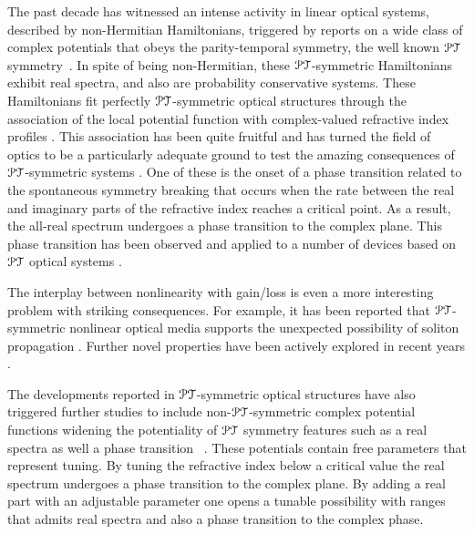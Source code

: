 \documentclass[aps,pre,showpacs,twocolumn]{revtex4}
\newcommand{\PT}{{\cal PT}}
\begin{document}
The past decade has witnessed an intense activity in linear optical systems, described by non-Hermitian Hamiltonians, triggered
by reports on a wide class of complex potentials that obeys the  parity-temporal symmetry, the well known $\PT$ symmetry~\cite{Bender1}. 
In spite of being non-Hermitian, these $\PT$-symmetric Hamiltonians exhibit real spectra, and also are probability conservative systems.  These 
Hamiltonians fit perfectly $\PT$-symmetric optical structures through the association of the local potential function with complex-valued refractive index profiles \cite{Ruter2010,peschel,peng}. This association 
has been quite fruitful and has turned the field of optics to be a particularly adequate ground to test the amazing consequences of $\PT$-symmetric systems \cite{Guo,Longhi,Makris}. One of these is the onset of a phase transition related to the spontaneous symmetry breaking that occurs when the rate between the real and imaginary parts of the refractive index reaches a critical point. As a result, the all-real spectrum undergoes a phase transition to the complex plane. This phase transition has been observed and applied to a number of devices based on $\PT$ optical systems \cite{feng2013,feng2014,science14}. 

The interplay between nonlinearity with gain/loss is even a more interesting problem with striking consequences. For example, it has been reported that $\PT$-symmetric nonlinear optical media supports the unexpected possibility of soliton propagation \cite{Christodoulides1}. Further novel properties have been actively explored in recent years \cite{malomed11,konotop12,yang12,segev13,ulf15}.  
 
The developments reported in $\PT$-symmetric optical structures have also triggered further studies 
to include non-$\PT$-symmetric complex potential functions widening 
the potentiality of $\PT$ symmetry 
features such as a real spectra as well a phase transition ~\cite{Cannata1998,Miri2013,Tsoy2014, Yang2016}. These potentials contain
free parameters that represent tuning. By tuning the refractive index below a critical value the real spectrum undergoes a phase transition 
to the complex plane. By adding a real 
part with an adjustable parameter 
one opens a tunable
possibility with ranges that admits real spectra and also a phase transition to the complex phase. 
\end{document}
